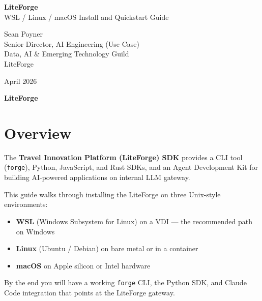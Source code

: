 \documentclass[11pt,letterpaper]{article}
\begin{document}
\begin{titlepage}
\centering
\vspace*{2cm}

{\Huge\bfseries\color{navybg}LiteForge}\\[6pt]
{\Large\color{walterpurple}WSL / Linux / macOS Install and Quickstart Guide}

\vspace{1.5cm}


\vspace{1.5cm}

{\large Sean Poyner}\\[4pt]
{\normalsize\color{forgegray}Senior Director, AI Engineering (Use Case)}\\[4pt]
{\normalsize\color{forgegray}Data, AI \& Emerging Technology Guild}\\[12pt]
{\normalsize LiteForge}

\vspace{1.5cm}

{\normalsize April 2026}

\vfill

{\small\color{alertred}\textbf{LiteForge}}
\end{titlepage}

\tableofcontents
\newpage

\section{Overview}

The \textbf{Travel Innovation Platform (LiteForge) SDK} provides a CLI tool
(\texttt{forge}), Python, JavaScript, and Rust SDKs, and an Agent Development
Kit for building AI-powered applications on internal LLM
gateway.

This guide walks through installing the LiteForge on three Unix-style
environments:
\begin{itemize}[nosep]
  \item \textbf{WSL} (Windows Subsystem for Linux) on a VDI ---
    the recommended path on Windows
  \item \textbf{Linux} (Ubuntu / Debian) on bare metal or in a container
  \item \textbf{macOS} on Apple silicon or Intel hardware
\end{itemize}
By the end you will have a working \texttt{forge} CLI, the Python SDK, and
Claude Code integration that points at the LiteForge gateway.
\end{document}

